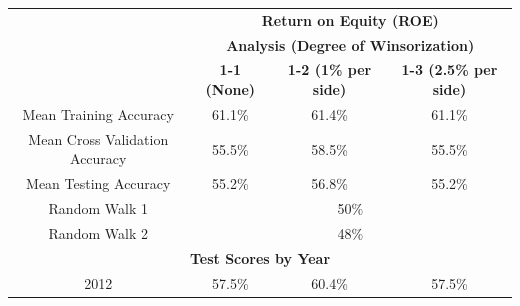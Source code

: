 {{\begin{table}[htb]
\centering
\begin{tabular}{cccc}
\multicolumn{1}{l}{}                                 & \multicolumn{3}{c}{\textbf{Return on Equity (ROE)}}                                                                                              \\ \cline{2-4} 
\multicolumn{1}{c|}{}                                & \multicolumn{3}{c|}{\textbf{Analysis (Degree of Winsorization)}}                                                                                 \\ \cline{2-4} 
\multicolumn{1}{c|}{}                                & \multicolumn{1}{c|}{\textbf{1-1 (None)}} & \multicolumn{1}{c|}{\textbf{1-2 (1\% per side)}} & \multicolumn{1}{c|}{\textbf{1-3 (2.5\% per side)}} \\ \hline
\multicolumn{1}{|c|}{Mean Training Accuracy}         & \multicolumn{1}{c|}{61.1\%}              & \multicolumn{1}{c|}{61.4\%}                      & \multicolumn{1}{c|}{61.1\%}                        \\ \hline
\multicolumn{1}{|c|}{Mean Cross Validation Accuracy} & \multicolumn{1}{c|}{55.5\%}              & \multicolumn{1}{c|}{58.5\%}                      & \multicolumn{1}{c|}{55.5\%}                        \\ \hline
\multicolumn{1}{|c|}{Mean Testing Accuracy}          & \multicolumn{1}{c|}{55.2\%}              & \multicolumn{1}{c|}{56.8\%}                      & \multicolumn{1}{c|}{55.2\%}                        \\ \hline
\multicolumn{1}{|c|}{Random Walk 1}                  & \multicolumn{3}{c|}{50\%}                                                                                                                         \\ \hline
\multicolumn{1}{|c|}{Random Walk 2}                  & \multicolumn{3}{c|}{48\%}                                                                                                                    \\ \hline
\multicolumn{4}{|c|}{\textbf{Test Scores by Year}}                                                                                                                                                      \\ \hline
\multicolumn{1}{|c|}{2012}                           & \multicolumn{1}{c|}{57.5\%}              & \multicolumn{1}{c|}{60.4\%}                      & \multicolumn{1}{c|}{57.5\%}                        \\ \hline

\end{tabular}
\end{table}}}
